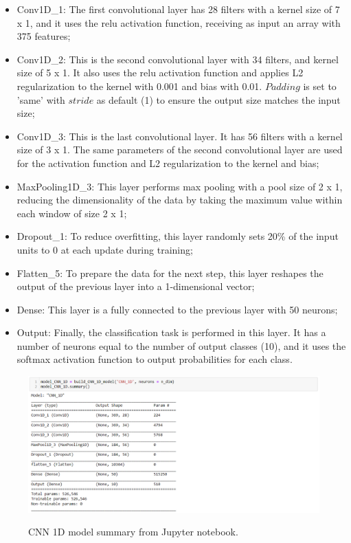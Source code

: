 \begin{itemize}
    \item Conv1D\_1: The first convolutional layer has 28 filters with a kernel size of 7 x 1, and it uses the \gls{relu} activation function, receiving as input an array with 375 features;
    \item Conv1D\_2: This is the second convolutional layer with 34 filters, and kernel size of 5 x 1. It also uses the \gls{relu} activation function and applies L2 regularization to the kernel with 0.001 and bias with 0.01. $Padding$ is set to 'same' with $stride$ as default (1) to ensure the output size matches the input size;
    \item Conv1D\_3: This is the last convolutional layer. It has 56 filters with a kernel size of 3 x 1. The same parameters of the second convolutional layer are used for the activation function and L2 regularization to the kernel and bias;
    \item MaxPooling1D\_3: This layer performs max pooling with a pool size of 2 x 1, reducing the dimensionality of the data by taking the maximum value within each window of size 2 x 1;
    \item Dropout\_1: To reduce overfitting, this layer randomly sets 20\% of the input units to 0 at each update during training; 
    \item Flatten\_5: To prepare the data for the next step, this layer reshapes the output of the previous layer into a 1-dimensional vector;
    \item Dense: This layer is a fully connected to the previous layer with 50 neurons; 
    \item Output: Finally, the classification task is performed in this layer. It has a number of neurons equal to the number of output classes (10), and it uses the softmax activation function to output probabilities for each class.
\end{itemize}

\begin{figure}[htbp]
    \raggedright
        \caption{CNN 1D model summary from Jupyter notebook.}
        \includegraphics[width=1\textwidth]{resources/images/050-methods/Methods_training_CNN1D_architecture_jupyter_notebook.png}
        \label{fig:methods_training_CNN_1D_architecture_jupyter_notebook}
\end{figure} 

